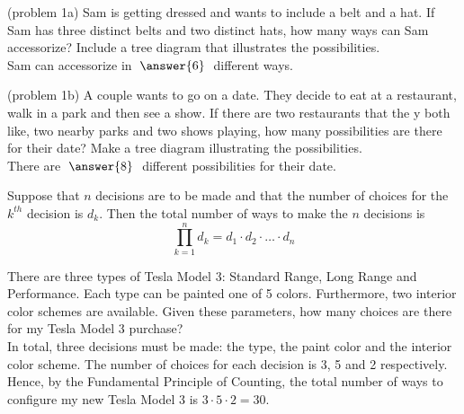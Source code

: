 \documentclass[handout]{ximera}
\begin{document}
\begin{problem}(problem 1a)
Sam is getting dressed and wants to include a belt and a hat.  
If Sam has three distinct belts and two distinct hats, how many ways
can Sam accessorize? Include a tree diagram that illustrates the possibilities.\\
Sam can accessorize in $\; \answer{6} \;$ different ways.
\end{problem}

\begin{problem}(problem 1b)
A couple wants to go on a date.  They decide to  eat at a restaurant, walk in a park and then see a show.
If there are two restaurants that the y both like, two nearby parks and two shows playing, 
how many possibilities are there for their date? Make a tree diagram illustrating the possibilities.\\
There are $\;\answer{8}\;$ different possibilities for their date.
\end{problem}


\begin{theorem}
Suppose that $n$ decisions are to be made and that the number of choices for the $k^{th}$ decision is $d_k$.
Then the total number of ways to make the $n$ decisions is
\[
\prod_{k=1}^n d_k = d_1 \cdot d_2 \cdot \ldots \cdot d_n
\]
\end{theorem}

\begin{example}
There are three types of Tesla Model 3: Standard Range, Long Range and Performance. 
Each type can be painted one of 5 colors. Furthermore, two interior color schemes are available. 
Given these parameters, how many choices are there for my Tesla Model 3 purchase?\\
In total, three decisions must be made: the type, the paint color and the interior color scheme.
The number of choices for each decision is 3, 5 and 2 respectively. 
Hence, by the Fundamental Principle of Counting, the total number of ways to configure my new 
Tesla Model 3 is $3 \cdot 5\cdot 2 = 30$.
\begin{image}
\end{image}
\end{example}
\end{document}
